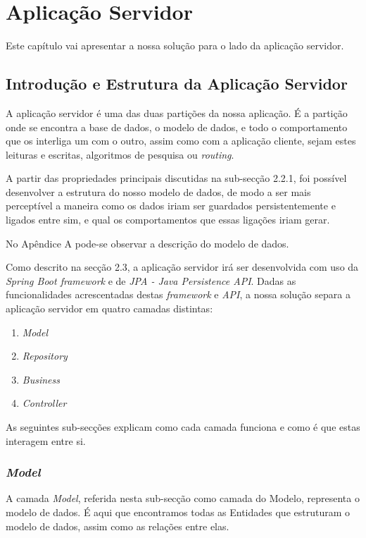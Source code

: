 %
\chapter{Aplicação Servidor} \label{cap:exemplos}

Este capítulo vai apresentar a nossa solução para o lado da aplicação servidor.

\section{Introdução e Estrutura da Aplicação Servidor} \label{sec31}
A aplicação servidor é uma das duas partições da nossa aplicação. É a partição onde se encontra a base de dados, o modelo de dados, e todo o comportamento que os interliga um com o outro, assim como com a aplicação cliente, sejam estes leituras e escritas, algoritmos de pesquisa ou \emph{routing}.

A partir das propriedades principais discutidas na sub-secção 2.2.1, foi possível desenvolver a estrutura do nosso modelo de dados, de modo a ser mais perceptível a maneira como os dados iriam ser guardados persistentemente e ligados entre sim, e qual os comportamentos que essas ligações iriam gerar. 

No Apêndice A pode-se observar a descrição do modelo de dados.

Como descrito na secção 2.3, a aplicação servidor irá ser desenvolvida com uso da \emph{Spring Boot framework} e de 
\emph{JPA - Java Persistence API}. Dadas as funcionalidades acrescentadas destas \emph{framework} e \emph{API}, a nossa solução separa a aplicação servidor em quatro camadas distintas:
\begin{enumerate}
	\item \emph{Model}
	\item \emph{Repository}
	\item \emph{Business}
	\item \emph{Controller}
\end{enumerate}
As seguintes sub-secções explicam como cada camada funciona e como é que estas interagem entre si.

\subsection{\emph{Model}} \label{sec311}
A camada \emph{Model}, referida nesta sub-secção como camada do Modelo, representa o modelo de dados. É aqui que encontramos todas as Entidades que estruturam o modelo de dados, assim como as relações entre elas. 

